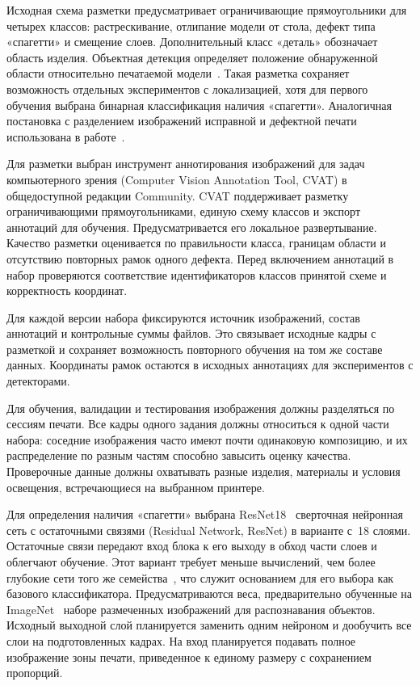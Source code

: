 Исходная схема разметки предусматривает ограничивающие прямоугольники для четырех классов: растрескивание, отлипание модели от стола, дефект типа «спагетти» и смещение слоев. Дополнительный класс «деталь» обозначает область изделия. Объектная детекция определяет положение обнаруженной области относительно печатаемой модели~\cite{брехт2022применение}. Такая разметка сохраняет возможность отдельных экспериментов с локализацией, хотя для первого обучения выбрана бинарная классификация наличия «спагетти». Аналогичная постановка с разделением изображений исправной и дефектной печати использована в работе~\cite{kim2020image}.

Для разметки выбран инструмент аннотирования изображений для задач компьютерного зрения (Computer Vision Annotation Tool, CVAT) в общедоступной редакции Community. CVAT поддерживает разметку ограничивающими прямоугольниками, единую схему классов и экспорт аннотаций для обучения. Предусматривается его локальное развертывание. Качество разметки оценивается по правильности класса, границам области и отсутствию повторных рамок одного дефекта. Перед включением аннотаций в набор проверяются соответствие идентификаторов классов принятой схеме и корректность координат.

Для каждой версии набора фиксируются источник изображений, состав аннотаций и контрольные суммы файлов. Это связывает исходные кадры с разметкой и сохраняет возможность повторного обучения на том же составе данных. Координаты рамок остаются в исходных аннотациях для экспериментов с детекторами.

Для обучения, валидации и тестирования изображения должны разделяться по сессиям печати. Все кадры одного задания должны относиться к одной части набора: соседние изображения часто имеют почти одинаковую композицию, и их распределение по разным частям способно завысить оценку качества. Проверочные данные должны охватывать разные изделия, материалы и условия освещения, встречающиеся на выбранном принтере.

Для определения наличия «спагетти» выбрана ResNet18~\textemdash{} сверточная нейронная сеть с остаточными связями (Residual Network, ResNet) в варианте с~18 слоями. Остаточные связи передают вход блока к его выходу в обход части слоев и облегчают обучение. Этот вариант требует меньше вычислений, чем более глубокие сети того же семейства~\cite{he2016deep}, что служит основанием для его выбора как базового классификатора. Предусматриваются веса, предварительно обученные на ImageNet~\textemdash{} наборе размеченных изображений для распознавания объектов. Исходный выходной слой планируется заменить одним нейроном и дообучить все слои на подготовленных кадрах. На вход планируется подавать полное изображение зоны печати, приведенное к единому размеру с сохранением пропорций.

